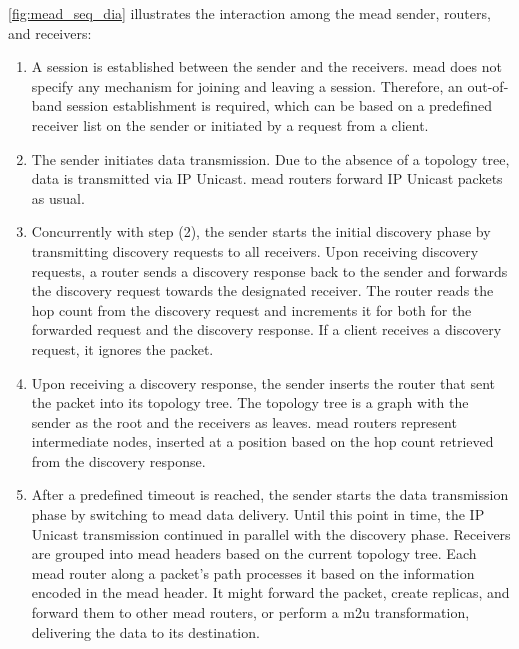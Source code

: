 \autoref{fig:mead_seq_dia} illustrates the interaction among the \gls{mead}
    sender, routers, and receivers: \cite{meadcast2}

\begin{enumerate}[label={(\arabic*)}]

\item
A session is established between the sender and the receivers.
\gls{mead} does not specify any mechanism for joining and leaving a session.
Therefore, an out-of-band session establishment is required, which can be based
    on a predefined receiver list on the sender or initiated by a request from
    a client.

\item
The sender initiates data transmission.
Due to the absence of a topology tree, data is transmitted via IP Unicast.
\gls{mead} routers forward IP Unicast packets as usual.

\item
Concurrently with step (2), the sender starts the initial discovery phase by
    transmitting discovery requests to all receivers.
Upon receiving discovery requests, a router sends a discovery response back to
    the sender and forwards the discovery request towards the designated
    receiver.
The router reads the hop count from the discovery request and increments it for
    both for the forwarded request and the discovery response.
If a client receives a discovery request, it ignores the packet.

\item
Upon receiving a discovery response, the sender inserts the router that sent
    the packet into its topology tree.
The topology tree is a graph with the sender as the root and the receivers as
    leaves.
\gls{mead} routers represent intermediate nodes, inserted at a position based
    on the hop count retrieved from the discovery response.

\item
After a predefined timeout is reached, the sender starts the data transmission
    phase by switching to \gls{mead} data delivery.
Until this point in time, the IP Unicast transmission continued in parallel
    with the discovery phase.
Receivers are grouped into \gls{mead} headers based on the current topology
    tree.
Each \gls{mead} router along a packet's path processes it based on the 
    information encoded in the \gls{mead} header.
It might forward the packet, create replicas, and forward them to other
    \gls{mead} routers, or perform a \gls{m2u} transformation, delivering the
    data to its destination.
\end{enumerate}

